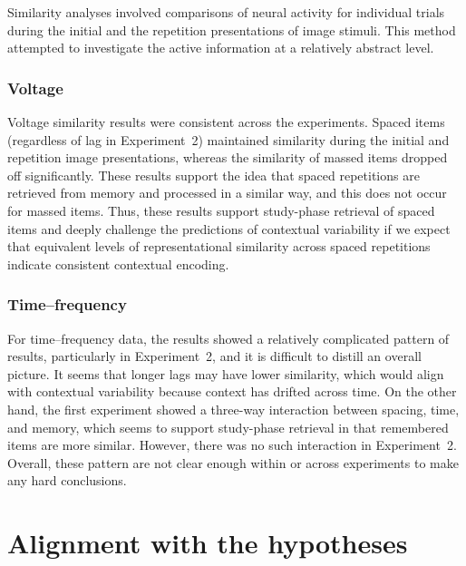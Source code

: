 Similarity analyses involved comparisons of neural activity for individual trials during the initial and the repetition presentations of image stimuli.  This method attempted to investigate the active information at a relatively abstract level.

\subsubsection{Voltage}

Voltage similarity results were consistent across the experiments.  Spaced items (regardless of lag in Experiment~2) maintained similarity during the initial and repetition image presentations, whereas the similarity of massed items dropped off significantly.  These results support the idea that spaced repetitions are retrieved from memory and processed in a similar way, and this does not occur for massed items.  Thus, these results support study-phase retrieval of spaced items and deeply challenge the predictions of contextual variability if we expect that equivalent levels of representational similarity across spaced repetitions indicate consistent contextual encoding.

\subsubsection{Time--frequency}

For time--frequency data, the results showed a relatively complicated pattern of results, particularly in Experiment~2, and it is difficult to distill an overall picture.  It seems that longer lags may have lower similarity, which would align with contextual variability because context has drifted across time.
On the other hand, the first experiment showed a three-way interaction between spacing, time, and memory, which seems to support study-phase retrieval in that remembered items are more similar.  However, there was no such interaction in Experiment~2.  Overall, these pattern are not clear enough within or across experiments to make any hard conclusions.




\section{Alignment with the hypotheses}

